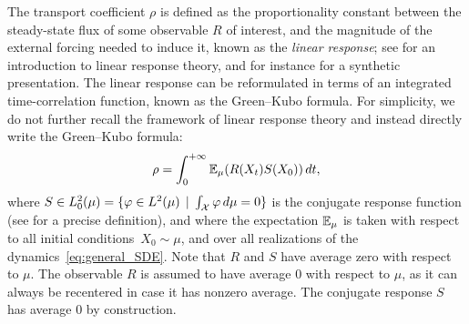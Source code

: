  The transport coefficient $\rho$ is defined as the proportionality constant between the steady-state flux of some observable $R$ of interest, and the magnitude of the external forcing needed to induce it, known as the \emph{linear response}; see \cite[Chapter 8]{chandler1987} for an introduction to linear response theory, and for instance \cite[Section 2]{synthetic2023} for a synthetic presentation. The linear response can be reformulated in terms of an integrated time-correlation function, known as the Green--Kubo formula. For simplicity, we do not further recall the framework of linear response theory and instead directly write the Green--Kubo formula:
%
\begin{align}
	\rho = \int_0^{+\infty} \E_\mu(R(X_t) S(X_0)) \, dt,%
	\label{eq:gk}
\end{align}
%
where $S \in L^2_0(\mu) = \{\varphi \in L^2(\mu) \, \mid \, \int_{\mathcal{X}} \varphi \, d\mu = 0\}$ is the conjugate response function (see \cite[Section 5.2.3]{acta_numerica2016} for a precise definition), and where the expectation $\mathbb{E}_\mu$ is taken with respect to all initial conditions~$X_0\sim \mu$, and over all realizations of the dynamics~\eqref{eq:general_SDE}. Note that $R$ and $S$ have average zero with respect to $\mu$. The observable $R$ is assumed to have average 0 with respect to $\mu$, as it can always be recentered in case it has nonzero average. The conjugate response $S$ has average 0 by construction.%

